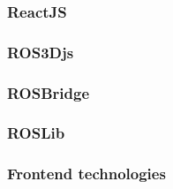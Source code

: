 \subsubsection{ReactJS}
\label{subsubsec:reactjs}

\subsubsection{ROS3Djs}
\label{subsubsec:ros3djs}

\subsubsection{ROSBridge}
\label{subsubsec:reactjs}

\subsubsection{ROSLib}
\label{subsubsec:roslib}

\subsubsection{Frontend technologies}
\label{subsubsec:frontend}
